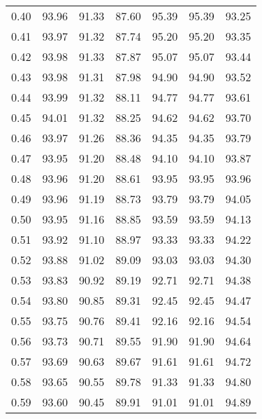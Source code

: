 \begin{tabular}{|c|c|c|c|c|c|c|}
      0.40 &     93.96 &     91.33 &      87.60 &   95.39 &      95.39 &         93.25 \\
      0.41 &     93.97 &     91.32 &      87.74 &   95.20 &      95.20 &         93.35 \\
      0.42 &     93.98 &     91.33 &      87.87 &   95.07 &      95.07 &         93.44 \\
      0.43 &     93.98 &     91.31 &      87.98 &   94.90 &      94.90 &         93.52 \\
      0.44 &     93.99 &     91.32 &      88.11 &   94.77 &      94.77 &         93.61 \\
      0.45 &     94.01 &     91.32 &      88.25 &   94.62 &      94.62 &         93.70 \\
      0.46 &     93.97 &     91.26 &      88.36 &   94.35 &      94.35 &         93.79 \\
      0.47 &     93.95 &     91.20 &      88.48 &   94.10 &      94.10 &         93.87 \\
      0.48 &     93.96 &     91.20 &      88.61 &   93.95 &      93.95 &         93.96 \\
      0.49 &     93.96 &     91.19 &      88.73 &   93.79 &      93.79 &         94.05 \\
      0.50 &     93.95 &     91.16 &      88.85 &   93.59 &      93.59 &         94.13 \\
      0.51 &     93.92 &     91.10 &      88.97 &   93.33 &      93.33 &         94.22 \\
      0.52 &     93.88 &     91.02 &      89.09 &   93.03 &      93.03 &         94.30 \\
      0.53 &     93.83 &     90.92 &      89.19 &   92.71 &      92.71 &         94.38 \\
      0.54 &     93.80 &     90.85 &      89.31 &   92.45 &      92.45 &         94.47 \\
      0.55 &     93.75 &     90.76 &      89.41 &   92.16 &      92.16 &         94.54 \\
      0.56 &     93.73 &     90.71 &      89.55 &   91.90 &      91.90 &         94.64 \\
      0.57 &     93.69 &     90.63 &      89.67 &   91.61 &      91.61 &         94.72 \\
      0.58 &     93.65 &     90.55 &      89.78 &   91.33 &      91.33 &         94.80 \\
      0.59 &     93.60 &     90.45 &      89.91 &   91.01 &      91.01 &         94.89 \\

\end{tabular}
